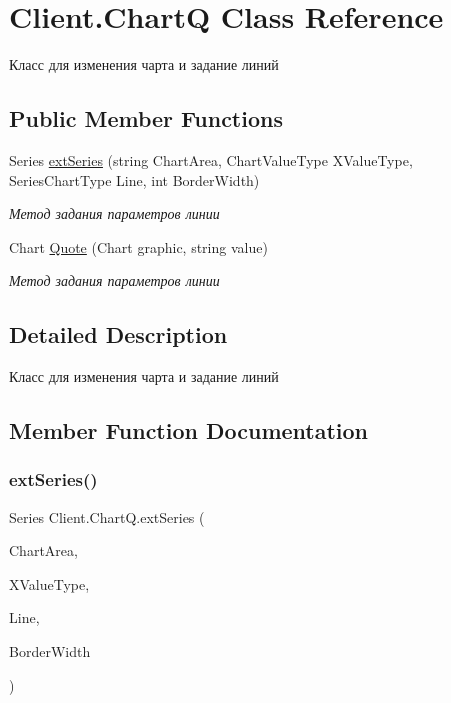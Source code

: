 \hypertarget{class_client_1_1_chart_q}{}\section{Client.\+ChartQ Class Reference}
\label{class_client_1_1_chart_q}


Класс для изменения чарта и задание линий  


\subsection*{Public Member Functions}
\begin{DoxyCompactItemize}
\item 
Series \hyperlink{class_client_1_1_chart_q_a23b497a1946f947333d86f5987f2321b}{ext\+Series} (string Chart\+Area, Chart\+Value\+Type X\+Value\+Type, Series\+Chart\+Type Line, int Border\+Width)
\begin{DoxyCompactList}\small\item\em Метод задания параметров линии \end{DoxyCompactList}\item 
Chart \hyperlink{class_client_1_1_chart_q_ae25afd3337c1460af47d6e26b69ba2df}{Quote} (Chart graphic, string value)
\begin{DoxyCompactList}\small\item\em Метод задания параметров линии \end{DoxyCompactList}\end{DoxyCompactItemize}


\subsection{Detailed Description}
Класс для изменения чарта и задание линий 



\subsection{Member Function Documentation}
\hypertarget{class_client_1_1_chart_q_a23b497a1946f947333d86f5987f2321b}{}\label{class_client_1_1_chart_q_a23b497a1946f947333d86f5987f2321b} 
\subsubsection{\texorpdfstring{ext\+Series()}{extSeries()}}
{\footnotesize\ttfamily Series Client.\+Chart\+Q.\+ext\+Series (\begin{DoxyParamCaption}\item[{string}]{Chart\+Area,  }\item[{Chart\+Value\+Type}]{X\+Value\+Type,  }\item[{Series\+Chart\+Type}]{Line,  }\item[{int}]{Border\+Width }\end{DoxyParamCaption})\hspace{0.3cm}{\ttfamily [inline]}}



